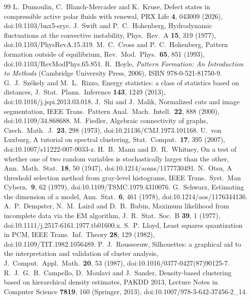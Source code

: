 \documentclass[11pt,a4paper]{article}
\begin{document}
\begin{thebibliography}{99}\small
{} L.~Dumoulin, C.~Blanch-Mercader and K.~Kruse, Defect states in compressible active polar fluids with renewal, PRX Life \textbf{4}, 043009 (2026), doi:10.1103/bnx5-sryc.
 J.~Swift and P.~C.~Hohenberg, Hydrodynamic fluctuations at the convective instability, Phys.\ Rev.\ A \textbf{15}, 319 (1977), doi:10.1103/PhysRevA.15.319.
 M.~C.~Cross and P.~C.~Hohenberg, Pattern formation outside of equilibrium, Rev.\ Mod.\ Phys.\ \textbf{65}, 851 (1993), doi:10.1103/RevModPhys.65.851.
 R.~Hoyle, \emph{Pattern Formation: An Introduction to Methods} (Cambridge University Press, 2006), ISBN 978-0-521-81750-9.
 G.~J.~Sz\'ekely and M.~L.~Rizzo, Energy statistics: a class of statistics based on distances, J.\ Stat.\ Plann.\ Inference \textbf{143}, 1249 (2013), doi:10.1016/j.jspi.2013.03.018.
 J.~Shi and J.~Malik, Normalized cuts and image segmentation, IEEE Trans.\ Pattern Anal.\ Mach.\ Intell.\ \textbf{22}, 888 (2000), doi:10.1109/34.868688.
 M.~Fiedler, Algebraic connectivity of graphs, Czech.\ Math.\ J.\ \textbf{23}, 298 (1973), doi:10.21136/CMJ.1973.101168.
 U.~von Luxburg, A tutorial on spectral clustering, Stat.\ Comput.\ \textbf{17}, 395 (2007), doi:10.1007/s11222-007-9033-z.
 H.~B.~Mann and D.~R.~Whitney, On a test of whether one of two random variables is stochastically larger than the other, Ann.\ Math.\ Stat.\ \textbf{18}, 50 (1947), doi:10.1214/aoms/1177730491.
 N.~Otsu, A threshold selection method from gray-level histograms, IEEE Trans.\ Syst.\ Man Cybern.\ \textbf{9}, 62 (1979), doi:10.1109/TSMC.1979.4310076.
 G.~Schwarz, Estimating the dimension of a model, Ann.\ Stat.\ \textbf{6}, 461 (1978), doi:10.1214/aos/1176344136.
 A.~P.~Dempster, N.~M.~Laird and D.~B.~Rubin, Maximum likelihood from incomplete data via the EM algorithm, J.\ R.\ Stat.\ Soc.\ B \textbf{39}, 1 (1977), doi:10.1111/j.2517-6161.1977.tb01600.x.
 S.~P.~Lloyd, Least squares quantization in PCM, IEEE Trans.\ Inf.\ Theory \textbf{28}, 129 (1982), doi:10.1109/TIT.1982.1056489.
 P.~J.~Rousseeuw, Silhouettes: a graphical aid to the interpretation and validation of cluster analysis, J.\ Comput.\ Appl.\ Math.\ \textbf{20}, 53 (1987), doi:10.1016/0377-0427(87)90125-7.
 R.~J.~G.~B.~Campello, D.~Moulavi and J.~Sander, Density-based clustering based on hierarchical density estimates, PAKDD 2013, Lecture Notes in Computer Science \textbf{7819}, 160 (Springer, 2013), doi:10.1007/978-3-642-37456-2\_14.

\end{thebibliography}
\end{document}
